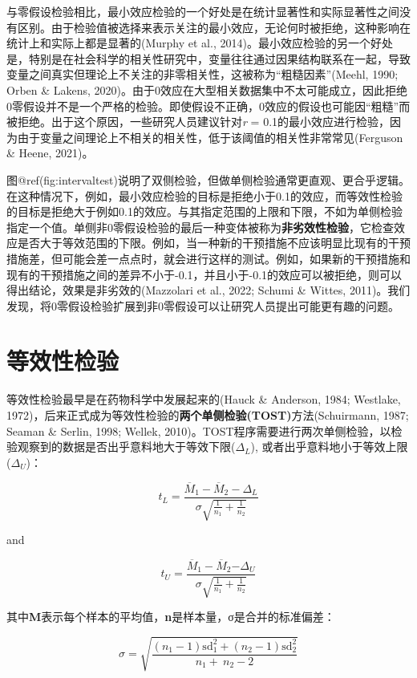 \documentclass[
  letterpaper,
  DIV=11,
  numbers=noendperiod]{scrreprt}
\begin{document}
与零假设检验相比，最小效应检验的一个好处是在统计显著性和实际显著性之间没有区别。由于检验值被选择来表示关注的最小效应，无论何时被拒绝，这种影响在统计上和实际上都是显著的(Murphy
et al.,
2014)。最小效应检验的另一个好处是，特别是在社会科学的相关性研究中，变量往往通过因果结构联系在一起，导致变量之间真实但理论上不关注的非零相关性，这被称为``粗糙因素''(Meehl,
1990; Orben \& Lakens,
2020)。由于0效应在大型相关数据集中不太可能成立，因此拒绝0零假设并不是一个严格的检验。即使假设不正确，0效应的假设也可能因``粗糙''而被拒绝。出于这个原因，一些研究人员建议针对\emph{r}
=
0.1的最小效应进行检验，因为由于变量之间理论上不相关的相关性，低于该阈值的相关性非常常见(Ferguson
\& Heene, 2021)。

图@ref(fig:intervaltest)说明了双侧检验，但做单侧检验通常更直观、更合乎逻辑。在这种情况下，例如，最小效应检验的目标是拒绝小于0.1的效应，而等效性检验的目标是拒绝大于例如0.1的效应。与其指定范围的上限和下限，不如为单侧检验指定一个值。单侧非0零假设检验的最后一种变体被称为\textbf{非劣效性检验}，它检查效应是否大于等效范围的下限。例如，当一种新的干预措施不应该明显比现有的干预措施差，但可能会差一点点时，就会进行这样的测试。例如，如果新的干预措施和现有的干预措施之间的差异不小于-0.1，并且小于-0.1的效应可以被拒绝，则可以得出结论，效果是非劣效的(Mazzolari
et al., 2022; Schumi \& Wittes,
2011)。我们发现，将0零假设检验扩展到非0零假设可以让研究人员提出可能更有趣的问题。

\hypertarget{ux7b49ux6548ux6027ux68c0ux9a8c}{%
\section{等效性检验}\label{ux7b49ux6548ux6027ux68c0ux9a8c}}

等效性检验最早是在药物科学中发展起来的(Hauck \& Anderson, 1984;
Westlake,
1972)，后来正式成为等效性检验的\textbf{两个单侧检验(TOST)}方法(Schuirmann,
1987; Seaman \& Serlin, 1998; Wellek,
2010)。TOST程序需要进行两次单侧检验，以检验观察到的数据是否出乎意料地大于等效下限(\(\Delta_{L}\)),
或者出乎意料地小于等效上限(\(\Delta_{U}\))：

\[
t_{L} = \frac{{\overline{M}}_{1} - {\overline{M}}_{2} - \Delta_{L}}{\sigma\sqrt{\frac{1}{n_{1}} + \frac{1}{n_{2}}}}
\]

and

\[
t_{U} = \frac{{\overline{M}}_{1} - {\overline{M}}_{2}{- \Delta}_{U}}{\sigma\sqrt{\frac{1}{n_{1}} + \frac{1}{n_{2}}}}
\]

其中\textbf{M}表示每个样本的平均值，\textbf{n}是样本量，σ是合并的标准偏差：

\[
\sigma = \sqrt{\frac{\left( n_{1} - 1 \right)\text{sd}_{1}^{2} + \left( n_{2} - 1 \right)\text{sd}_{2}^{2}}{n_{1} + \ n_{2} - 2}}
\]
\end{document}
